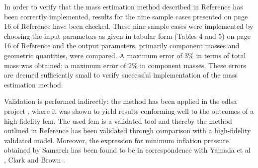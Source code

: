 In order to verify that the mass estimation method described in Reference \cite{Samareh2011} has been correctly implemented, results for the nine sample cases presented on page 16 of Reference \cite{Samareh2011} have been checked. These nine sample cases were implemented by choosing the input parameters as given in tabular form (Tables 4 and 5) on page 16 of Reference \cite{Samareh2011} and the output parameters, primarily component masses and geometric quantities, were compared. A maximum error of 3\% in terms of total mass was obtained; a maximum error of 2\% in component masses. These errors are deemed sufficiently small to verify successful implementation of the mass estimation method.

Validation is performed indirectly: the method \cite{Samareh2011} has been applied in the \gls{edlsa} project \cite{Cianciolo2010}, where it was shown to yield results conforming well to the outcomes of a high-fidelity \gls{fem}. The used \gls{fem} is a validated tool \cite{Cianciolo2010} and thereby the method outlined in Reference \cite{Samareh2011} has been validated through comparison with a high-fidelity validated model. Moreover, the expression for minimum inflation pressure obtained by Samareh has been found to be in correspondence with Yamada et al \cite{Yamada2009}, Clark \cite{Clark2009} and Brown \cite{Brown2009}.



